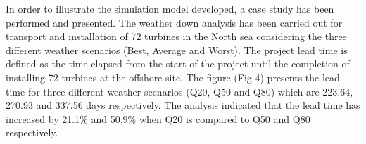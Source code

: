 In order to illustrate the simulation model developed, a case study has been performed and presented. The weather down analysis has been carried out for transport and installation of 72 turbines in the North sea considering the three different weather scenarios (Best, Average and Worst). The project lead time is defined as the time elapsed from the start of the project until the completion of installing 72 turbines at the offshore site. The figure (Fig 4) presents the lead time for three different weather scenarios (Q20, Q50 and Q80) which are 223.64, 270.93 and 337.56 days respectively. The analysis indicated that the lead time has increased by 21.1\% and 50,9\% when Q20 is compared to Q50 and Q80 respectively. 

